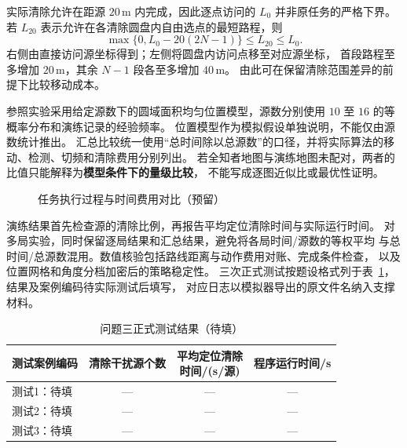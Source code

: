 \documentclass[UTF8,a4paper,12pt]{ctexart}
\begin{document}
实际清除允许在距源 $20\,\mathrm m$ 内完成，因此逐点访问的 $L_0$ 并非原任务的严格下界。
若 $L_{20}$ 表示允许在各清除圆盘内自由选点的最短路程，则
\begin{equation}
  \max\{0,L_0-20(2N-1)\}\leq L_{20}\leq L_0.
  \label{eq:q3-oracle-bound}
\end{equation}
右侧由直接访问源坐标得到；左侧将圆盘内访问点移至对应源坐标，
首段路程至多增加 $20\,\mathrm m$，其余 $N-1$ 段各至多增加 $40\,\mathrm m$。
由此可在保留清除范围差异的前提下比较移动成本。

参照实验采用给定源数下的圆域面积均匀位置模型，源数分别使用
$10$ 至 $16$ 的等概率分布和演练记录的经验频率。
位置模型作为模拟假设单独说明，不能仅由源数统计推出。
汇总比较统一使用“总时间除以总源数”的口径，并将实际算法的移动、检测、切频和清除费用分别列出。
若全知者地图与演练地图未配对，两者的比值只能解释为\textbf{模型条件下的量级比较}，
不能写成逐图近似比或最优性证明。

\begin{figure}[htbp]
  \centering
  \caption{任务执行过程与时间费用对比（预留）}
  \label{fig:q3-validation}
\end{figure}

演练结果首先检查源的清除比例，再报告平均定位清除时间与实际运行时间。
对多局实验，同时保留逐局结果和汇总结果，避免将各局时间/源数的等权平均
与总时间/总源数混用。数值核验包括路线距离与动作费用对账、完成条件检查，
以及位置网格和角度分档加密后的策略稳定性。
三次正式测试按题设格式列于表~\ref{tab:q3-official}，结果及案例编码待实际测试后填写，
对应日志以模拟器导出的原文件名纳入支撑材料。

\begin{table}[htbp]
  \centering
  \caption{问题三正式测试结果（待填）}
  \label{tab:q3-official}
  \small
  \renewcommand{\arraystretch}{1.25}
  \begin{tabularx}{0.96\linewidth}{Xccc}
    \toprule
    测试案例编码 & 清除干扰源个数 & \shortstack{平均定位清除\\时间/(s/源)} & 程序运行时间/s \\
    \midrule
    测试1：待填 & --- & --- & --- \\
    测试2：待填 & --- & --- & --- \\
    测试3：待填 & --- & --- & --- \\
    \bottomrule
  \end{tabularx}
\end{table}
\end{document}
